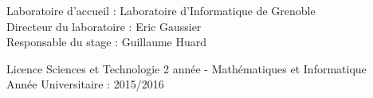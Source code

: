 \documentclass[a4paper,12pt]{report}
\begin{document}
\begin{titlepage}
\begin{flushleft}
	Laboratoire d'accueil : Laboratoire d'Informatique de Grenoble\\
	Directeur du laboratoire : Eric Gaussier\\
	Responsable du stage : Guillaume Huard\\[1.0cm]
\end{flushleft}

\begin{flushright}
	Licence Sciences et Technologie 2 année - Mathématiques et 		Informatique\\
	Année Universitaire : 2015/2016
\end{flushright}

\end{titlepage}

\end{document}
